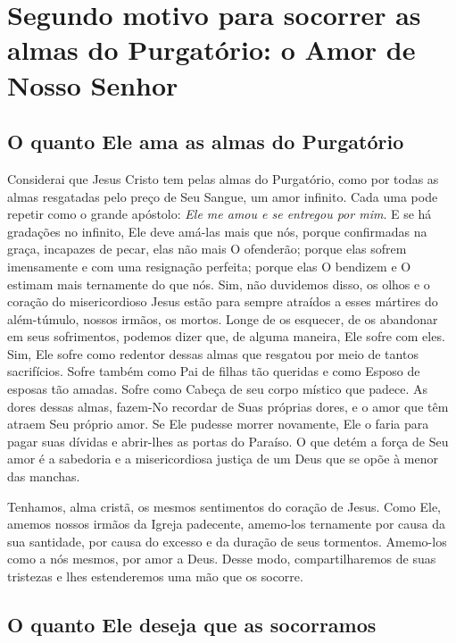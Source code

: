 \renewcommand{\thechapterdisplay}{Décimo sétimo dia}
\renewcommand{\thechapterrunner}{Segundo motivo: o Amor de Nosso Senhor}
\chapter[Décimo sétimo dia --- Segundo motivo para socorrer as almas do Purgatório: o Amor de Nosso Senhor]{Segundo motivo para socorrer as almas do Purgatório: o Amor de Nosso Senhor}
\section*{O quanto Ele ama as almas do Purgatório }

Considerai que Jesus Cristo tem pelas almas do Purgatório, como por todas as almas resgatadas pelo preço de Seu Sangue, um amor infinito. Cada uma pode repetir como o grande apóstolo: \textit{Ele me amou e se entregou por mim}. E se há gradações no infinito, Ele deve amá-las mais que nós, porque confirmadas na graça, incapazes de pecar, elas não mais O ofenderão; porque elas sofrem imensamente e com uma resignação perfeita; porque elas O bendizem e O estimam mais ternamente do que nós. Sim, não duvidemos disso, os olhos e o coração do misericordioso Jesus estão para sempre atraídos a esses mártires do além-túmulo, nossos irmãos, os mortos. Longe de os esquecer, de os abandonar em seus sofrimentos, podemos dizer que, de alguma maneira, Ele sofre com eles. Sim, Ele sofre como redentor dessas almas que resgatou por meio de tantos sacrifícios. Sofre também como Pai de filhas tão queridas e como Esposo de esposas tão amadas. Sofre como Cabeça de seu corpo místico que padece. As dores dessas almas, fazem-No recordar de Suas próprias dores, e o amor que têm atraem Seu próprio amor. Se Ele pudesse morrer novamente, Ele o faria para pagar suas dívidas e abrir-lhes as portas do Paraíso. O que detém a força de Seu amor é a sabedoria e a misericordiosa justiça de um Deus que se opõe à menor das manchas. 

Tenhamos, alma cristã, os mesmos sentimentos do coração de Jesus. Como Ele, amemos nossos irmãos da Igreja padecente, amemo-los ternamente por causa da sua santidade, por causa do excesso e da duração de seus tormentos. Amemo-los como a nós mesmos, por amor a Deus. Desse modo, compartilharemos de suas tristezas e lhes estenderemos uma mão que os socorre.


\section*{O quanto Ele deseja que as socorramos}

